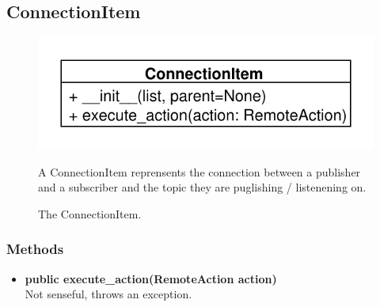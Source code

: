 \subsection{ConnectionItem}
\begin{figure}[htbp]
	\begin{minipage}[t]{7cm}
		\vspace{0pt}
		\centering
		\includegraphics[scale=0.6]{./diagram_pictures/ConnectionItem.pdf}
		\caption{The ConnectionItem.}
	\end{minipage}
	\hfill
	\begin{minipage}[t]{8cm}
		\vspace{10pt}
		A ConnectionItem reprensents the connection between a publisher and a
		subscriber and the topic they are puglishing / listenening on.
	\end{minipage}
\end{figure}  
\subsubsection{Methods}
\begin{itemize}
  \item \textbf{public execute\_action(RemoteAction action)}\\ 
  Not senseful, throws an exception.
\end{itemize}



